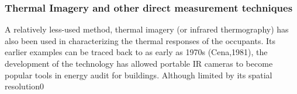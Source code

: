 \subsubsection{Thermal Imagery and other direct measurement techniques}
	A relatively less-used method, thermal imagery (or infrared thermography) has also been used in characterizing the thermal responses of the occupants. Its earlier examples can be traced back to as early as 1970s (Cena,1981), the development of the technology has allowed portable IR cameras to become popular tools in energy audit for buildings\cite{lucchi_applications_2018}. Although limited by its spatial resolution0 
            
            
  